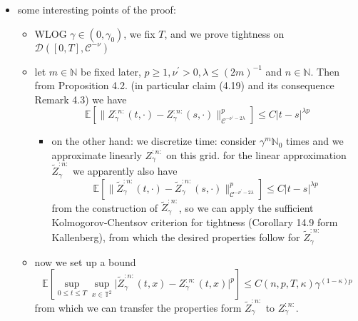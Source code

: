 \documentclass{report}
\theoremstyle{remark}
\theoremstyle{definition}
\begin{document}
\begin{itemize}
\begin{itemize}
    \item some interesting points of the proof:
    \begin{itemize}
      \item WLOG $\gamma \in (0, \gamma_0)$, we fix $T$, and we prove tightness on $\mathcal{D}([0, T], \mathcal{C}^{-\nu})$
      \item let $m \in \mathbb{N}$ be fixed later, $p \ge 1, \nu^\prime > 0, \lambda \le (2m)^{-1}$ and $n \in \mathbb{N}$. Then from Proposition 4.2. (in particular claim (4.19) and its consequence Remark 4.3) we have $$\mathbb{E}\left[ \lVert Z_\gamma^{:n:}(t, \cdot) - Z_\gamma^{:n:}(s, \cdot)\rVert^p_{\mathcal{C}^{-\nu^\prime -2\lambda}} \right]\le C\lvert t-s \rvert^{\lambda p}$$
      \begin{itemize}
        \item on the other hand: we discretize time: consider $\gamma^m \mathbb{N}_0$  times and we approximate linearly $Z_\gamma^{:n:}$ on this grid. for the linear approximation $\tilde{Z}_\gamma^{:n:}$ we apparently also have $$\mathbb{E}\left[ \lVert \tilde{Z}_\gamma^{:n:}(t, \cdot) - \tilde{Z}_\gamma^{:n:}(s, \cdot)\rVert^p_{\mathcal{C}^{-\nu^\prime -2\lambda}} \right]\le C\lvert t-s \rvert^{\lambda p}$$from the construction of $\tilde{Z}_\gamma^{:n:}$, so we can apply the sufficient Kolmogorov-Chentsov criterion for tightness (Corollary 14.9 form Kallenberg), from which the desired properties follow for $\tilde{Z}^{:n:}_\gamma$
      \end{itemize}
      \item now we set up a bound $$\mathbb{E}\left[ \sup_{0 \le t \le T} \sup_{x \in \mathbb{T}^2} \lvert \tilde{Z}^{:n:}_\gamma(t, x) - {Z}^{:n:}_\gamma(t, x) \rvert^p \right]\le C(n, p, T, \kappa) \gamma^{(1-\kappa)p}$$from which we can transfer the properties form $\tilde{Z}^{:n:}_\gamma$ to ${Z}^{:n:}_\gamma$.
    \end{itemize}
  \end{itemize}
\end{itemize}
\end{document}
